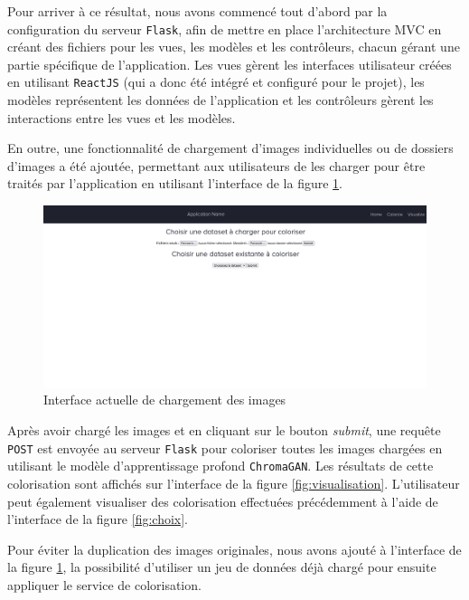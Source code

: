 \documentclass{article}
\begin{document}
Pour arriver à ce résultat, nous avons commencé tout d’abord par la configuration du serveur \texttt{Flask}, afin de mettre en place l’architecture MVC en créant des fichiers pour les vues, les modèles et les contrôleurs, chacun gérant une partie spécifique de l'application. 
Les vues gèrent les interfaces utilisateur créées en utilisant \texttt{ReactJS} (qui a donc été intégré et configuré pour le projet), les modèles représentent les données de l'application et les contrôleurs 
gèrent les interactions entre les vues et les modèles.

En outre, une fonctionnalité de chargement d'images individuelles ou de dossiers d'images a été ajoutée, permettant aux utilisateurs de les charger pour être traités par l'application en utilisant 
l’interface de la figure \ref{fig:chargement}.

\begin{figure}[!h]
    \centering
    \includegraphics[width=15cm]{img/interface-chargement.png}
    \caption{Interface actuelle de chargement des images}
    \label{fig:chargement}
\end{figure}

Après avoir chargé les images et en cliquant sur le bouton \textit{submit}, une requête \texttt{POST} est envoyée au serveur \texttt{Flask} pour coloriser toutes les images chargées en utilisant le modèle d'apprentissage profond \texttt{ChromaGAN}. Les résultats de 
cette colorisation sont affichés sur l'interface de la figure \ref{fig:visualisation}. L’utilisateur peut également visualiser des colorisation effectuées précédemment à l'aide de l'interface de la figure \ref{fig:choix}.

Pour éviter la duplication des images originales, nous avons ajouté à l'interface de la figure \ref{fig:chargement}, la possibilité d’utiliser un jeu 
de données déjà chargé pour ensuite appliquer le service de colorisation.
\end{document}
